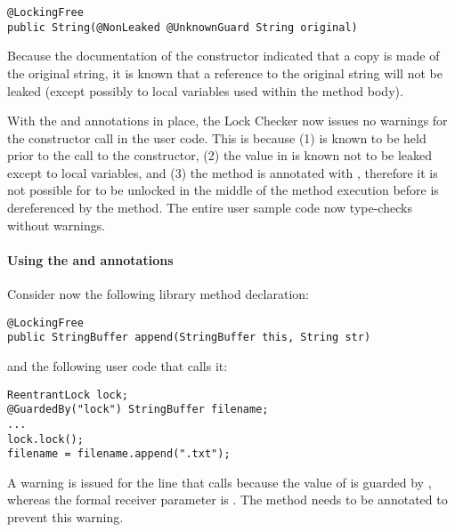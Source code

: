 \begin{verbatim}
@LockingFree
public String(@NonLeaked @UnknownGuard String original)
\end{verbatim}

Because the documentation of the constructor indicated that a copy
is made of the original string, it is known that a reference to the
original string will not be leaked (except possibly to local variables
used within the method body).

With the  and  annotations in place, the
Lock Checker now issues no warnings for the 
constructor call in the user code.  This is because (1) 
is known to be held prior to the call to the constructor, (2) the
value in  is known not to be leaked except to local
variables, and (3) the method is annotated with ,
therefore it is not possible for  to be unlocked in the
middle of the method execution before  is dereferenced
by the method.  The entire user sample code now type-checks without
warnings.

\paragraph{Using the  and  annotations\label{lock-checker-library-methods-polyguardedby-and-leakedtoresult}}

Consider now the following library method declaration:

\begin{verbatim}
@LockingFree
public StringBuffer append(StringBuffer this, String str)
\end{verbatim}

and the following user code that calls it:

\begin{verbatim}
ReentrantLock lock;
@GuardedBy("lock") StringBuffer filename;
...
lock.lock();
filename = filename.append(".txt");
\end{verbatim}

A warning is issued
for the line that calls  because the value of
 is guarded by , whereas the formal receiver parameter
 is .  The 
method needs to be annotated to prevent this warning.

